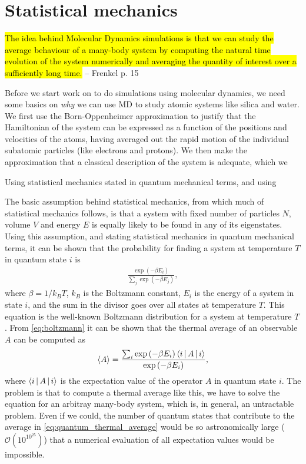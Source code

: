 \chapter{Statistical mechanics}
\hl{The idea behind Molecular Dynamics simulations is that we can study the average behaviour of a many-body system by computing the natural time evolution of the system numerically and averaging the quantity of interest over a sufficiently long time.} -- Frenkel p. 15

Before we start work on to do simulations using molecular dynamics, we need some basics on \emph{why} we can use MD to study atomic systems like silica and water. We first use the Born-Oppenheimer approximation to justify that the Hamiltonian of the system can be expressed as a function of the positions and velocities of the atoms, having averaged out the rapid motion of the individual subatomic particles (like electrons and protons). We then make the approximation that a classical description of the system is adequate, which we 


Using statistical mechanics stated in quantum mechanical terms, and using

The basic assumption behind statistical mechanics, from which much of statistical mechanics follows, is that a system with fixed number of particles $N$, volume $V$ and energy $E$ is equally likely to be found in any of its eigenstates. Using this assumption, and stating statistical mechanics in quantum mechanical terms, it can be shown that the probability for finding a system at temperature $T$ in quantum state $i$ is
\begin{align}
    \frac{\exp\left(-\beta E_i\right)}{\sum_j \exp\left( -\beta E_j\right)},
    \label{eq:boltzmann}
\end{align}
where $\beta = 1/k_B T$, $k_B$ is the Boltzmann constant, $E_i$ is the energy of a system in state $i$, and the sum in the divisor goes over all states at temperature $T$. This equation is the well-known Boltzmann distribution for a system at temperature $T$. From \cref{eq:boltzmann} it can be shown that the thermal average of an observable $A$ can be computed as
\begin{align}
    \langle A \rangle =
    \frac{
        \sum_i \exp \left( -\beta E_i \right) \Braket{i|A|i}
    }{
        \exp \left( -\beta E_i \right)
    },
    \label{eq:quantum_thermal_average}
\end{align}
where $\Braket{i|A|i}$ is the expectation value of the operator $A$ in quantum state $i$. The problem is that to compute a thermal average like this, we have to solve the \Schr~ equation for an arbitray many-body system, which is, in general, an untractable problem. Even if we could, the number of quantum states that contribute to the average in \cref{eq:quantum_thermal_average} would be so astronomically large ($\mathcal{O}(10^{10^{25}})$) that a numerical evaluation of all expectation values would be impossible.


